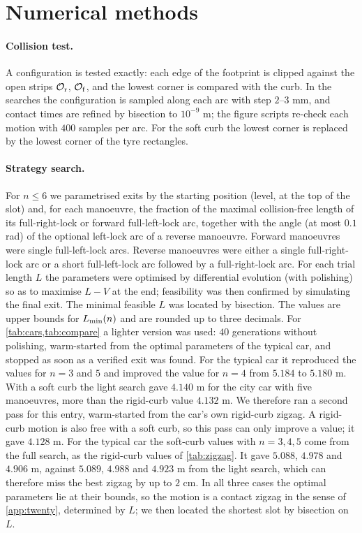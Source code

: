 \section{Numerical methods}\label{app:numerics}

\paragraph{Collision test.}
A configuration is tested exactly: each edge of the footprint is clipped against the open strips $\mathcal{O}_{\mathrm r}$, $\mathcal{O}_{\mathrm f}$, and the lowest corner is compared with the curb.
In the searches the configuration is sampled along each arc with step $2$--$3$ mm, and contact times are refined by bisection to $10^{-9}$ m; the figure scripts re-check each motion with $400$ samples per arc.
For the soft curb the lowest corner is replaced by the lowest corner of the tyre rectangles.

\paragraph{Strategy search.}
For $n\le6$ we parametrised exits by the starting position (level, at the top of the slot) and, for each manoeuvre, the fraction of the maximal collision-free length of its full-right-lock or forward full-left-lock arc, together with the angle (at most $0.1$ rad) of the optional left-lock arc of a reverse manoeuvre.
Forward manoeuvres were single full-left-lock arcs.
Reverse manoeuvres were either a single full-right-lock arc or a short full-left-lock arc followed by a full-right-lock arc.
For each trial length $L$ the parameters were optimised by differential evolution (with polishing) so as to maximise $L-V$ at the end; feasibility was then confirmed by simulating the final exit.
The minimal feasible $L$ was located by bisection.
The values are upper bounds for $L_{\min}(n)$ and are rounded up to three decimals.
For \cref{tab:cars,tab:compare} a lighter version was used: $40$ generations without polishing, warm-started from the optimal parameters of the typical car, and stopped as soon as a verified exit was found.
For the typical car it reproduced the values for $n=3$ and $5$ and improved the value for $n=4$ from $5.184$ to $5.180$ m.
With a soft curb the light search gave $4.140$ m for the city car with five manoeuvres, more than the rigid-curb value $4.132$ m.
We therefore ran a second pass for this entry, warm-started from the car's own rigid-curb zigzag.
A rigid-curb motion is also free with a soft curb, so this pass can only improve a value; it gave $4.128$ m.
For the typical car the soft-curb values with $n=3,4,5$ come from the full search, as the rigid-curb values of \cref{tab:zigzag}.
It gave $5.088$, $4.978$ and $4.906$ m, against $5.089$, $4.988$ and $4.923$ m from the light search, which can therefore miss the best zigzag by up to $2$ cm.
In all three cases the optimal parameters lie at their bounds, so the motion is a contact zigzag in the sense of \cref{app:twenty}, determined by $L$; we then located the shortest slot by bisection on $L$.

